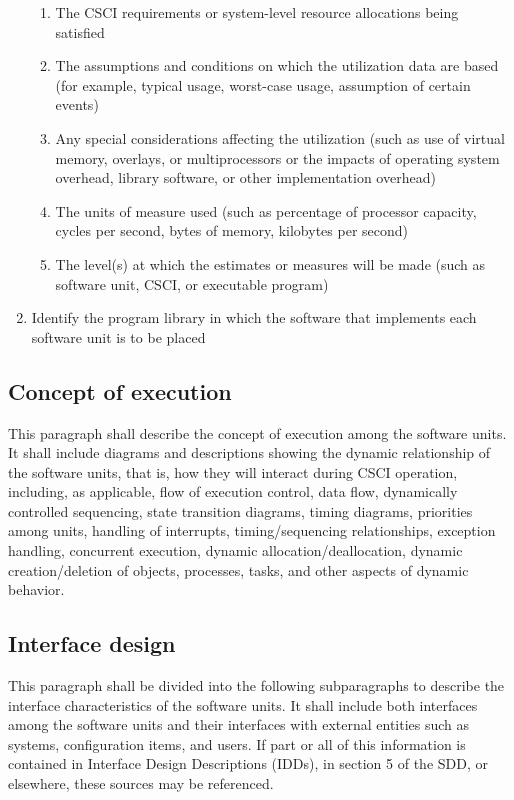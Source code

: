\begin{enumerate}
  \begin{enumerate}
  \itemsep1pt\parskip0pt
  \item
    The CSCI requirements or system-level resource allocations being
    satisfied
  \item
    The assumptions and conditions on which the utilization data are
    based (for example, typical usage, worst-case usage, assumption of
    certain events)
  \item
    Any special considerations affecting the utilization (such as use of
    virtual memory, overlays, or multiprocessors or the impacts of
    operating system overhead, library software, or other implementation
    overhead)
  \item
    The units of measure used (such as percentage of processor capacity,
    cycles per second, bytes of memory, kilobytes per second)
  \item
    The level(s) at which the estimates or measures will be made (such
    as software unit, CSCI, or executable program)
  \end{enumerate}
\item
  Identify the program library in which the software that implements
  each software unit is to be placed
\end{enumerate}

\subsection{Concept of execution}

This paragraph shall describe the concept of execution among the
software units. It shall include diagrams and descriptions showing the
dynamic relationship of the software units, that is, how they will
interact during CSCI operation, including, as applicable, flow of
execution control, data flow, dynamically controlled sequencing, state
transition diagrams, timing diagrams, priorities among units, handling
of interrupts, timing/sequencing relationships, exception handling,
concurrent execution, dynamic allocation/deallocation, dynamic
creation/deletion of objects, processes, tasks, and other aspects of
dynamic behavior.

\subsection{Interface design}

This paragraph shall be divided into the following subparagraphs to
describe the interface characteristics of the software units. It shall
include both interfaces among the software units and their interfaces
with external entities such as systems, configuration items, and users.
If part or all of this information is contained in Interface Design
Descriptions (IDDs), in section 5 of the SDD, or elsewhere, these
sources may be referenced.

